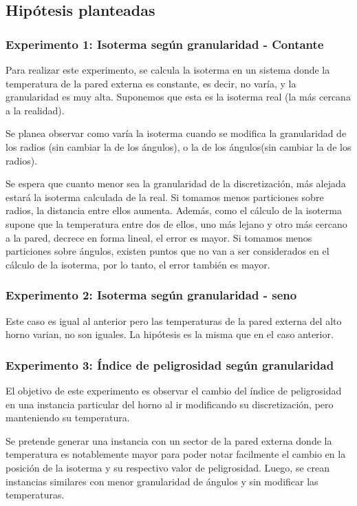   \subsection{Hipótesis planteadas}

    \subsubsection*{Experimento 1: Isoterma según granularidad - Contante}
    Para realizar este experimento, se calcula la isoterma en un sistema donde la temperatura de la pared externa es constante, es decir, no varía, y la granularidad es muy alta. Suponemos que esta es la isoterma real (la más cercana a la realidad). 

    Se planea observar como varía la isoterma cuando se modifica la granularidad de los radios (sin cambiar la de los ángulos), o la de los ángulos(sin cambiar la de los radios).

    Se espera que cuanto menor sea la granularidad de la discretización, más alejada estará la isoterma calculada de la real. Si tomamos menos particiones sobre radios, la distancia entre ellos aumenta. Además, como el cálculo de la isoterma supone que la temperatura entre dos de ellos, uno más lejano y otro más cercano a la pared, decrece en forma lineal, el error es mayor. Si tomamos menos particiones sobre ángulos, existen puntos que no van a ser considerados en el cálculo de la isoterma, por lo tanto, el error también es mayor.

    \subsubsection*{Experimento 2: Isoterma según granularidad - seno}
    Este caso es igual al anterior pero las temperaturas de la pared externa del alto horno varian, no son iguales. La hipótesis es la misma que en el caso anterior.



  	\subsubsection*{Experimento 3: Índice de peligrosidad según granularidad}
  	El objetivo de este experimento es observar el cambio del índice de peligrosidad en una instancia particular del horno al ir modificando su discretización, pero manteniendo su temperatura. 

  	Se pretende generar una instancia con un sector de la pared externa donde la temperatura es notablemente mayor para poder notar facilmente el cambio en la posición de la isoterma y su respectivo valor de peligrosidad. Luego, se crean instancias similares con menor granularidad de ángulos y sin modificar las temperaturas. 

